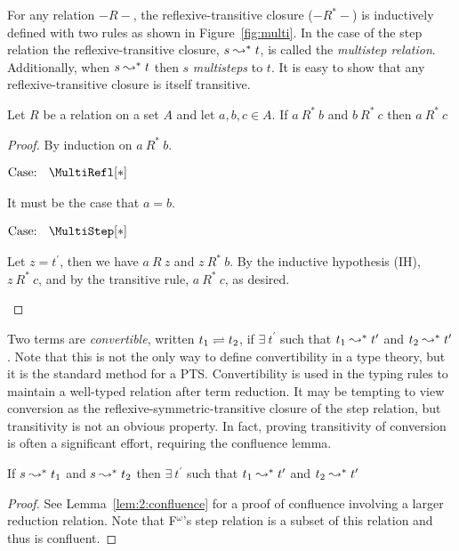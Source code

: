 

For any relation $-R-$, the reflexive-transitive closure ($-R^*-$) is inductively defined with two rules as shown in Figure~\ref{fig:multi}.
In the case of the step relation the reflexive-transitive closure, $s \leadsto^* t$, is called the \textit{multistep relation}.
Additionally, when $s \leadsto^* t$ then $s$ \textit{multisteps} to $t$.
It is easy to show that any reflexive-transitive closure is itself transitive.

\begin{lemma}
    Let $R$ be a relation on a set $A$ and let $a, b, c \in A$. If $a\ R^*\ b$ and $b\ R^*\ c$ then $a\ R^*\ c$
\end{lemma}
\begin{proof}
    By induction on $a\ R^*\ b$.

    $\text{Case: }\begin{array}{c} \MultiRefl[*] \end{array}$
    \begin{proofcase}
        It must be the case that $a = b$.
    \end{proofcase}

    $\text{Case: }\begin{array}{c} \MultiStep[*] \end{array}$
    \begin{proofcase}
        Let $z = t^\prime$, then we have $a\ R\ z$ and $z\ R^*\ b$.
        By the inductive hypothesis (IH), $z\ R^*\ c$, and by the transitive rule, $a\ R^*\ c$, as desired.
    \end{proofcase}
\end{proof}

Two terms are \textit{convertible}, written $t_1 \rightleftharpoons t_2$, if $\exists\ t^\prime$ such that $t_1 \leadsto^* t^\prime$ and $t_2 \leadsto^* t^\prime$.
Note that this is not the only way to define convertibility in a type theory, but it is the standard method for a PTS.
Convertibility is used in the typing rules to maintain a well-typed relation after term reduction.
It may be tempting to view conversion as the reflexive-symmetric-transitive closure of the step relation, but transitivity is not an obvious property.
In fact, proving transitivity of conversion is often a significant effort, requiring the confluence lemma.

\begin{lemma}[Confluence]
    If $s \leadsto^* t_1$ and $s \leadsto^* t_2$ then $\exists\ t^\prime$ such that $t_1 \leadsto^* t^\prime$ and $t_2 \leadsto^* t^\prime$
\end{lemma}
\begin{proof}
    See Lemma~\ref{lem:2:confluence} for a proof of confluence involving a larger reduction relation.
    Note that F$^\omega$'s step relation is a subset of this relation and thus is confluent.
\end{proof}

